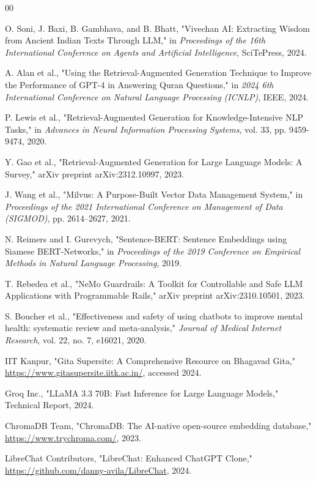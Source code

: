 \documentclass[conference]{IEEEtran}
\begin{document}
\begin{thebibliography}{00}

 O. Soni, J. Baxi, B. Gambhava, and B. Bhatt, "Vivechan AI: Extracting Wisdom from Ancient Indian Texts Through LLM," in \textit{Proceedings of the 16th International Conference on Agents and Artificial Intelligence}, SciTePress, 2024.

 A. Alan et al., "Using the Retrieval-Augmented Generation Technique to Improve the Performance of GPT-4 in Answering Quran Questions," in \textit{2024 6th International Conference on Natural Language Processing (ICNLP)}, IEEE, 2024.

 P. Lewis et al., "Retrieval-Augmented Generation for Knowledge-Intensive NLP Tasks," in \textit{Advances in Neural Information Processing Systems}, vol. 33, pp. 9459-9474, 2020.

 Y. Gao et al., "Retrieval-Augmented Generation for Large Language Models: A Survey," arXiv preprint arXiv:2312.10997, 2023.

 J. Wang et al., "Milvus: A Purpose-Built Vector Data Management System," in \textit{Proceedings of the 2021 International Conference on Management of Data (SIGMOD)}, pp. 2614–2627, 2021.

 N. Reimers and I. Gurevych, "Sentence-BERT: Sentence Embeddings using Siamese BERT-Networks," in \textit{Proceedings of the 2019 Conference on Empirical Methods in Natural Language Processing}, 2019.

 T. Rebedea et al., "NeMo Guardrails: A Toolkit for Controllable and Safe LLM Applications with Programmable Rails," arXiv preprint arXiv:2310.10501, 2023.

 S. Boucher et al., "Effectiveness and safety of using chatbots to improve mental health: systematic review and meta-analysis," \textit{Journal of Medical Internet Research}, vol. 22, no. 7, e16021, 2020.

 IIT Kanpur, "Gita Supersite: A Comprehensive Resource on Bhagavad Gita," \url{https://www.gitasupersite.iitk.ac.in/}, accessed 2024.

 Groq Inc., "LLaMA 3.3 70B: Fast Inference for Large Language Models," Technical Report, 2024.

 ChromaDB Team, "ChromaDB: The AI-native open-source embedding database," \url{https://www.trychroma.com/}, 2023.

 LibreChat Contributors, "LibreChat: Enhanced ChatGPT Clone," \url{https://github.com/danny-avila/LibreChat}, 2024.

\end{thebibliography}

\vspace{12pt}
\end{document}
